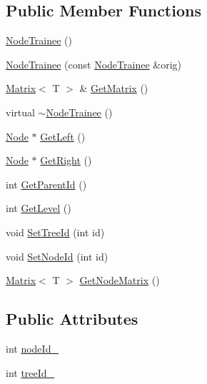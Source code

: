 \subsection*{Public Member Functions}
\begin{DoxyCompactItemize}
\item 
\hyperlink{classrdf_1_1bpc_1_1NodeTrainee_a2c076c9286a88ce049e4e6c8707e32ba}{Node\+Trainee} ()
\item 
\hyperlink{classrdf_1_1bpc_1_1NodeTrainee_a0b8bb46d5559d8f665e73b3284e4a615}{Node\+Trainee} (const \hyperlink{classrdf_1_1bpc_1_1NodeTrainee}{Node\+Trainee} \&orig)
\item 
\hyperlink{classrdf_1_1bpc_1_1Matrix}{Matrix}$<$ T $>$ \& \hyperlink{classrdf_1_1bpc_1_1NodeTrainee_ab1ae16941f52a5f38e438b13ed3cee53}{Get\+Matrix} ()
\item 
virtual \hyperlink{classrdf_1_1bpc_1_1NodeTrainee_a952e836bd65a9219a3ec03b3c6935583}{$\sim$\+Node\+Trainee} ()
\item 
\hyperlink{classrdf_1_1Node}{Node} $\ast$ \hyperlink{classrdf_1_1bpc_1_1NodeTrainee_a36238c22d5235ba77091693343d0b723}{Get\+Left} ()
\item 
\hyperlink{classrdf_1_1Node}{Node} $\ast$ \hyperlink{classrdf_1_1bpc_1_1NodeTrainee_a5f0aa7a3ba0d742c980215b9be8a9c3c}{Get\+Right} ()
\item 
int \hyperlink{classrdf_1_1bpc_1_1NodeTrainee_a9d46183bfc982ccb802f7d3e47d109dc}{Get\+Parent\+Id} ()
\item 
int \hyperlink{classrdf_1_1bpc_1_1NodeTrainee_acc58b2d13c5e637938ac7a8934a739bb}{Get\+Level} ()
\item 
void \hyperlink{classrdf_1_1bpc_1_1NodeTrainee_af7bb9c9df89101c4911fe9713ed6aff5}{Set\+Tree\+Id} (int id)
\item 
void \hyperlink{classrdf_1_1bpc_1_1NodeTrainee_a6c42d9a2911c014addb9c5021a484085}{Set\+Node\+Id} (int id)
\item 
\hyperlink{classrdf_1_1bpc_1_1Matrix}{Matrix}$<$ T $>$ \hyperlink{classrdf_1_1bpc_1_1NodeTrainee_aa1879ed3aa007bb3d67cdea5ddbaa45f}{Get\+Node\+Matrix} ()
\end{DoxyCompactItemize}
\subsection*{Public Attributes}
\begin{DoxyCompactItemize}
\item 
int \hyperlink{classrdf_1_1bpc_1_1NodeTrainee_a208e3eafbece621b9618f6e3ddd27947}{node\+Id\+\_\+}
\item 
int \hyperlink{classrdf_1_1bpc_1_1NodeTrainee_a04ec4bdb96ed7d47ab99e6a4f65294f3}{tree\+Id\+\_\+}
\end{DoxyCompactItemize}
